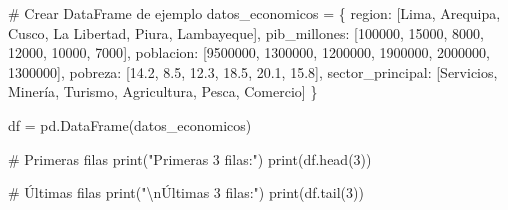 \documentclass[
  doc,
  floatsintext,
  longtable,
  a4paper,
  nolmodern,
  notxfonts,
  notimes,
  12pt,
  colorlinks=true,linkcolor=blue,citecolor=blue,urlcolor=blue]{apa7}
\newenvironment{Shaded}{\begin{snugshade}}{\end{snugshade}}
\newcommand{\BuiltInTok}[1]{\textcolor[rgb]{0.00,0.23,0.31}{#1}}
\newcommand{\CharTok}[1]{\textcolor[rgb]{0.13,0.47,0.30}{#1}}
\newcommand{\CommentTok}[1]{\textcolor[rgb]{0.37,0.37,0.37}{#1}}
\newcommand{\DecValTok}[1]{\textcolor[rgb]{0.68,0.00,0.00}{#1}}
\newcommand{\FloatTok}[1]{\textcolor[rgb]{0.68,0.00,0.00}{#1}}
\newcommand{\NormalTok}[1]{\textcolor[rgb]{0.00,0.23,0.31}{#1}}
\newcommand{\OperatorTok}[1]{\textcolor[rgb]{0.37,0.37,0.37}{#1}}
\newcommand{\StringTok}[1]{\textcolor[rgb]{0.13,0.47,0.30}{#1}}
\begin{document}
\begin{Shaded}
\begin{Highlighting}[]
\CommentTok{\# Crear DataFrame de ejemplo}
\NormalTok{datos\_economicos }\OperatorTok{=}\NormalTok{ \{}
    \StringTok{\textquotesingle{}region\textquotesingle{}}\NormalTok{: [}\StringTok{\textquotesingle{}Lima\textquotesingle{}}\NormalTok{, }\StringTok{\textquotesingle{}Arequipa\textquotesingle{}}\NormalTok{, }\StringTok{\textquotesingle{}Cusco\textquotesingle{}}\NormalTok{, }\StringTok{\textquotesingle{}La Libertad\textquotesingle{}}\NormalTok{, }\StringTok{\textquotesingle{}Piura\textquotesingle{}}\NormalTok{, }\StringTok{\textquotesingle{}Lambayeque\textquotesingle{}}\NormalTok{],}
    \StringTok{\textquotesingle{}pib\_millones\textquotesingle{}}\NormalTok{: [}\DecValTok{100000}\NormalTok{, }\DecValTok{15000}\NormalTok{, }\DecValTok{8000}\NormalTok{, }\DecValTok{12000}\NormalTok{, }\DecValTok{10000}\NormalTok{, }\DecValTok{7000}\NormalTok{],}
    \StringTok{\textquotesingle{}poblacion\textquotesingle{}}\NormalTok{: [}\DecValTok{9500000}\NormalTok{, }\DecValTok{1300000}\NormalTok{, }\DecValTok{1200000}\NormalTok{, }\DecValTok{1900000}\NormalTok{, }\DecValTok{2000000}\NormalTok{, }\DecValTok{1300000}\NormalTok{],}
    \StringTok{\textquotesingle{}pobreza\textquotesingle{}}\NormalTok{: [}\FloatTok{14.2}\NormalTok{, }\FloatTok{8.5}\NormalTok{, }\FloatTok{12.3}\NormalTok{, }\FloatTok{18.5}\NormalTok{, }\FloatTok{20.1}\NormalTok{, }\FloatTok{15.8}\NormalTok{],}
    \StringTok{\textquotesingle{}sector\_principal\textquotesingle{}}\NormalTok{: [}\StringTok{\textquotesingle{}Servicios\textquotesingle{}}\NormalTok{, }\StringTok{\textquotesingle{}Minería\textquotesingle{}}\NormalTok{, }\StringTok{\textquotesingle{}Turismo\textquotesingle{}}\NormalTok{, }\StringTok{\textquotesingle{}Agricultura\textquotesingle{}}\NormalTok{, }\StringTok{\textquotesingle{}Pesca\textquotesingle{}}\NormalTok{, }\StringTok{\textquotesingle{}Comercio\textquotesingle{}}\NormalTok{]}
\NormalTok{\}}

\NormalTok{df }\OperatorTok{=}\NormalTok{ pd.DataFrame(datos\_economicos)}

\CommentTok{\# Primeras filas}
\BuiltInTok{print}\NormalTok{(}\StringTok{"Primeras 3 filas:"}\NormalTok{)}
\BuiltInTok{print}\NormalTok{(df.head(}\DecValTok{3}\NormalTok{))}

\CommentTok{\# Últimas filas}
\BuiltInTok{print}\NormalTok{(}\StringTok{"}\CharTok{\textbackslash{}n}\StringTok{Últimas 3 filas:"}\NormalTok{)}
\BuiltInTok{print}\NormalTok{(df.tail(}\DecValTok{3}\NormalTok{))}


\end{Highlighting}
\end{Shaded}
\end{document}
